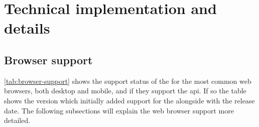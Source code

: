 \section{Technical implementation and details}

\newpage
\subsection{Browser support}

\autoref{tab:browser-support} shows the support status of the \wa{} for the most common web browsers, both desktop and mobile, and if they support the \gls{api}. If so the table shows the version which initially added support for the \wa{} alongside with the release date. The following subsections will explain the web browser support more detailed.

